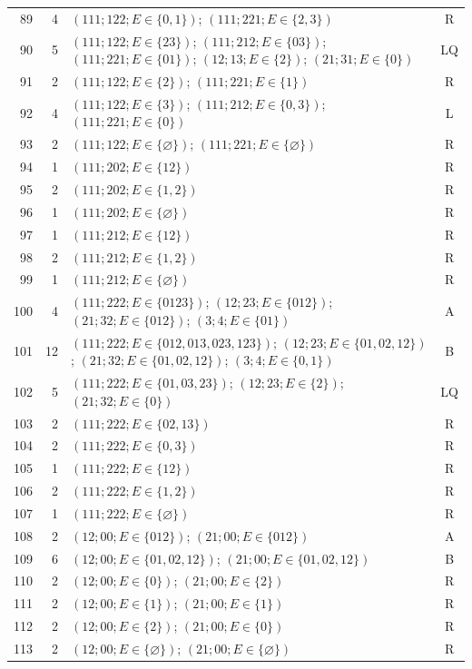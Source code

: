 \begin{longtable}{@{}r r p{10.1cm} c@{}}
89 & 4 & $(111;122;E\in\{0,1\})$; $(111;221;E\in\{2,3\})$ & R\\[1mm]
90 & 5 & $(111;122;E\in\{23\})$; $(111;212;E\in\{03\})$; $(111;221;E\in\{01\})$; $(12;13;E\in\{2\})$; $(21;31;E\in\{0\})$ & LQ\\[1mm]
91 & 2 & $(111;122;E\in\{2\})$; $(111;221;E\in\{1\})$ & R\\[1mm]
92 & 4 & $(111;122;E\in\{3\})$; $(111;212;E\in\{0,3\})$; $(111;221;E\in\{0\})$ & L\\[1mm]
93 & 2 & $(111;122;E\in\{\varnothing\})$; $(111;221;E\in\{\varnothing\})$ & R\\[1mm]
94 & 1 & $(111;202;E\in\{12\})$ & R\\[1mm]
95 & 2 & $(111;202;E\in\{1,2\})$ & R\\[1mm]
96 & 1 & $(111;202;E\in\{\varnothing\})$ & R\\[1mm]
97 & 1 & $(111;212;E\in\{12\})$ & R\\[1mm]
98 & 2 & $(111;212;E\in\{1,2\})$ & R\\[1mm]
99 & 1 & $(111;212;E\in\{\varnothing\})$ & R\\[1mm]
100 & 4 & $(111;222;E\in\{0123\})$; $(12;23;E\in\{012\})$; $(21;32;E\in\{012\})$; $(3;4;E\in\{01\})$ & A\\[1mm]
101 & 12 & $(111;222;E\in\{012,013,023,123\})$; $(12;23;E\in\{01,02,12\})$; $(21;32;E\in\{01,02,12\})$; $(3;4;E\in\{0,1\})$ & B\\[1mm]
102 & 5 & $(111;222;E\in\{01,03,23\})$; $(12;23;E\in\{2\})$; $(21;32;E\in\{0\})$ & LQ\\[1mm]
103 & 2 & $(111;222;E\in\{02,13\})$ & R\\[1mm]
104 & 2 & $(111;222;E\in\{0,3\})$ & R\\[1mm]
105 & 1 & $(111;222;E\in\{12\})$ & R\\[1mm]
106 & 2 & $(111;222;E\in\{1,2\})$ & R\\[1mm]
107 & 1 & $(111;222;E\in\{\varnothing\})$ & R\\[1mm]
108 & 2 & $(12;00;E\in\{012\})$; $(21;00;E\in\{012\})$ & A\\[1mm]
109 & 6 & $(12;00;E\in\{01,02,12\})$; $(21;00;E\in\{01,02,12\})$ & B\\[1mm]
110 & 2 & $(12;00;E\in\{0\})$; $(21;00;E\in\{2\})$ & R\\[1mm]
111 & 2 & $(12;00;E\in\{1\})$; $(21;00;E\in\{1\})$ & R\\[1mm]
112 & 2 & $(12;00;E\in\{2\})$; $(21;00;E\in\{0\})$ & R\\[1mm]
113 & 2 & $(12;00;E\in\{\varnothing\})$; $(21;00;E\in\{\varnothing\})$ & R\\[1mm]

\end{longtable}
